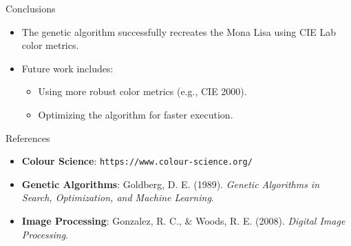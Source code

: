 \begin{frame}{Conclusions}
    \begin{itemize}
        \item The genetic algorithm successfully recreates the Mona Lisa using CIE Lab color metrics.
        \item Future work includes:
              \begin{itemize}
                  \item Using more robust color metrics (e.g., CIE 2000).
                  \item Optimizing the algorithm for faster execution.
              \end{itemize}
    \end{itemize}
\end{frame}

\begin{frame}{References}
    \begin{itemize}
        \item \textbf{Colour Science}: \texttt{https://www.colour-science.org/}
        \item \textbf{Genetic Algorithms}: Goldberg, D. E. (1989). \textit{Genetic Algorithms in Search, Optimization, and Machine Learning}.
        \item \textbf{Image Processing}: Gonzalez, R. C., \& Woods, R. E. (2008). \textit{Digital Image Processing}.
    \end{itemize}
\end{frame}